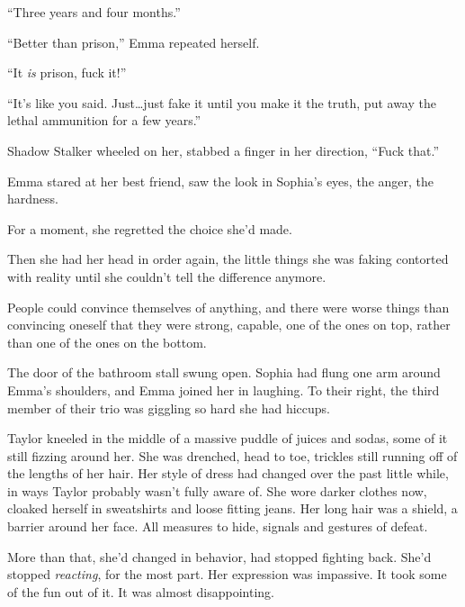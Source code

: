 ``Three years and four months.''



``Better than prison,'' Emma repeated herself.



``It \emph{is} prison, fuck it!''



``It's like you said.  Just\ldots just fake it until you make it the truth, put away the lethal ammunition for a few years.''



Shadow Stalker wheeled on her, stabbed a finger in her direction, ``Fuck that.''



Emma stared at her best friend, saw the look in Sophia's eyes, the anger, the hardness.



For a moment, she regretted the choice she'd made.



Then she had her head in order again, the little things she was faking contorted with reality until she couldn't tell the difference anymore.



People could convince themselves of anything, and there were worse things than convincing oneself that they were strong, capable, one of the ones on top, rather than one of the ones on the bottom.



\blacksquare



The door of the bathroom stall swung open.  Sophia had flung one arm around Emma's shoulders, and Emma joined her in laughing.  To their right, the third member of their trio was giggling so hard she had hiccups.



Taylor kneeled in the middle of a massive puddle of juices and sodas, some of it still fizzing around her.  She was drenched, head to toe, trickles still running off of the lengths of her hair.  Her style of dress had changed over the past little while, in ways Taylor probably wasn't fully aware of.  She wore darker clothes now, cloaked herself in sweatshirts and loose fitting jeans.  Her long hair was a shield, a barrier around her face.  All measures to hide, signals and gestures of defeat.



More than that, she'd changed in behavior, had stopped fighting back. She'd stopped \emph{reacting}, for the most part.  Her expression was impassive.  It took some of the fun out of it.  It was almost disappointing.



